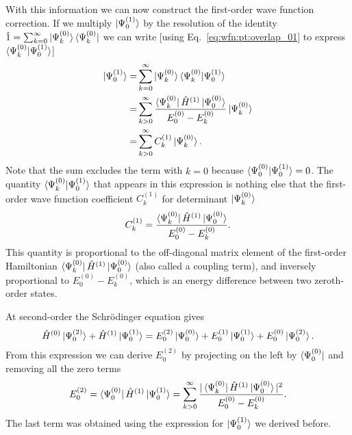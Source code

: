 \documentclass[../Main/chem532-notes.tex]{subfiles}
\begin{document}
With this information we can now construct the first-order wave function correction.
If we multiply $\ket{\Psi_0^{(1)}}$ by the resolution of the identity $\hat{1} = \sum_{k = 0}^\infty \ket{\Psi_k^{(0)}}\bra{\Psi_k^{(0)}}$ we can write [using Eq.~\eqref{eq:wfn:pt:overlap_01} to express $ \braket{\Psi_k^{(0)} | \Psi_0^{(1)}}$] 
\begin{equation}
\begin{split}
\ket{\Psi_0^{(1)}} = & \sum_{k = 0}^\infty \ket{\Psi_k^{(0)}}\braket{\Psi_k^{(0)} | \Psi_0^{(1)}} \\
= &\sum_{k > 0}^\infty 
\frac{\bra{\Psi_k^{(0)}} \hat{H}^{(1)}\ket{\Psi_0^{(0)}}}{E_0^{(0)} - E_k^{(0)}}  \ket{\Psi_k^{(0)}}\\
=&\sum_{k > 0}^\infty 
C_k^{(1)} \ket{\Psi_k^{(0)}}.
\end{split}
\end{equation}
Note that the sum excludes the term with $k = 0$ because $ \braket{\Psi_0^{(0)} | \Psi_0^{(1)}} = 0$.
The quantity $ \braket{\Psi_k^{(0)} | \Psi_0^{(1)}}$ that appears in this expression is nothing else that the first-order wave function coefficient $C_k^{(1)}$ for determinant $\ket{\Psi_k^{(0)}}$
\begin{equation}
C_k^{(1)}  = \frac{\bra{\Psi_k^{(0)}} \hat{H}^{(1)}\ket{\Psi_0^{(0)}}}{E_0^{(0)} - E_k^{(0)}}.
\end{equation}
This quantity is proportional to the off-diagonal matrix element of the first-order Hamiltonian  $\bra{\Psi_k^{(0)}} \hat{H}^{(1)}\ket{\Psi_0^{(0)}}$ (also called a coupling term), and inversely proportional to $E_0^{(0)} - E_k^{(0)}$, which is an energy difference between two zeroth-order states.

At second-order the Schr\"{o}dinger equation gives
\begin{equation}
\hat{H}^{(0)}\ket{\Psi_0^{(2)}} + \hat{H}^{(1)}\ket{\Psi_0^{(1)}}= E_0^{(2)}\ket{\Psi_0^{(0)}} + E_0^{(1)}\ket{\Psi_0^{(1)}}
+ E_0^{(0)}\ket{\Psi_0^{(2)}}.
\end{equation}
From this expression we can derive $E_0^{(2)}$ by projecting on the left by $\bra{\Psi_0^{(0)}}$ and removing all the zero terms
\begin{equation}
E_0^{(2)} = \bra{\Psi_0^{(0)}}\hat{H}^{(1)}\ket{\Psi_0^{(1)}}
= \sum_{k > 0}^\infty 
\frac{|\bra{\Psi_k^{(0)}} \hat{H}^{(1)}\ket{\Psi_0^{(0)}}|^2}{E_0^{(0)} - E_k^{(0)}}.
\end{equation}
The last term was obtained using the expression for $\ket{\Psi_0^{(1)}}$ we derived before.
\end{document}

